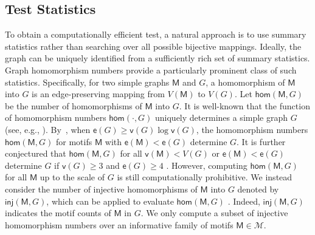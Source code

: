 \documentclass[letterpaper,11pt]{article}
\theoremstyle{definition}
\newcommand{\nbr}[1]{{\sf\color{red}[#1]}}
\newcommand{\en}{\mathsf{{e}}}
\newcommand{\vn}{\mathsf{{v}}}
\newcommand{\calM}{{\mathcal{M}}}
\newcommand{\sfM}{{\mathsf{M}}}
\renewcommand{\hom}{\mathsf{hom}}
\newcommand{\inj}{\mathsf{inj}}
\begin{document}
\subsection{Test Statistics}\label{sec:method}

To obtain a computationally efficient test, a natural approach is to use summary statistics rather than searching over all possible bijective mappings. 
Ideally, the graph can be uniquely identified from a sufficiently rich set of summary statistics. 
Graph homomorphism numbers provide a particularly prominent class of such statistics. 
Specifically, for two simple graphs $\sfM$ and $G$,
a homomorphism of $\sfM$ into $G$ is an edge-preserving mapping from $V(\sfM)$ to $V(G)$. Let $\hom(\sfM,G)$ be the number of homomorphisms of $\sfM$ into $G$.  
It is well-known that the function of homomorphism numbers $\hom(\cdot,G)$ uniquely determines a simple graph $G$ (see, e.g., \cite[Theorem 5.29]{lovasz2012large}). By~\cite{muller1977edge}, when $\en(G)\ge \vn(G)\log \vn(G)$, the homomorphism numbers $\hom(\sfM,G)$ for motifs $\sfM$ with $\en(\sfM)<\en(G)$ determine $G$. It is further conjectured that $\hom(\sfM,G)$ for all $\vn(\sfM)<V(G)$ or $\en(\sfM)<\en(G)$ determine $G$ if $\vn(G)\ge 3$ and $\en(G)\ge 4$ \cite[Conjectures 5.30 and  5.31]{lovasz2012large}.
However, computing $\hom(\sfM,G)$ for all $\sfM$ up to the scale of $G$ is still computationally prohibitive. 
We instead consider the number of injective homomorphisms of $\sfM$ into $G$ denoted by $\inj(\sfM,G)$, which can be applied to evaluate $\hom(\sfM,G)$ \cite[(5.16)]{lovasz2012large}.
Indeed, $\inj(\sfM,G)$ indicates the motif counts of $\sfM$ in $G$. 
We only compute a subset of injective homomorphism numbers over an informative family of motifs $\sfM\in \calM$. 
\end{document}
